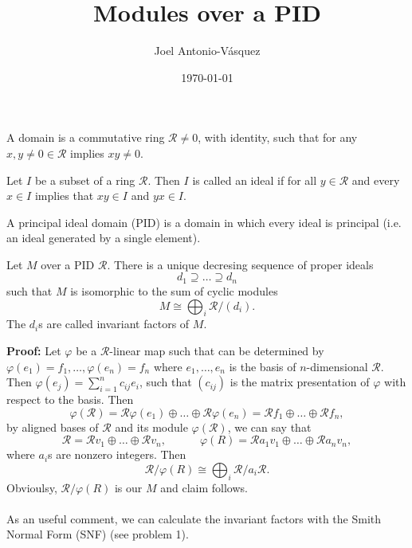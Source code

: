 \documentclass[11pt]{scrartcl}
\newcommand{\CR}{\mathcal R}
\begin{document}
\title{Modules over a PID}
\author{Joel Antonio-V\'asquez}
\date{\today}
\maketitle

\begin{definition*}
  A domain is a commutative ring $\CR \neq 0$, with identity, such that for any $x, y \neq 0 \in \CR$ implies $xy \neq 0$.
\end{definition*}

\begin{definition*}
  Let $I$ be a subset of a ring $\CR$. Then $I$ is called an ideal if for all $y \in \CR$ and every $x \in I$ implies that $xy \in I$ and $yx \in I$.
\end{definition*}

\begin{definition*}
  A principal ideal domain (PID) is a domain in which every ideal is principal (i.e. an ideal generated by a single element).
\end{definition*}

\begin{theorem}
  \label{theo:1}
  Let $M$ over a PID $\CR$. There is a unique decresing sequence of proper ideals
  $$
  d_{1} \supseteq \dots \supseteq d_{n}
  $$
  such that $M$ is isomorphic to the sum of cyclic modules
  $$
  M \cong \bigoplus_{i} \CR/(d_{i}).
  $$
  The $d_{i}$s are called invariant factors of $M$.
\end{theorem}
\textbf{Proof: }Let $\varphi$ be a $\CR$-linear map such that can be determined by $\varphi(e_{1}) = f_{1}, \dots, \varphi(e_{n}) = f_{n}$
where $e_{1}, \dots, e_{n}$ is the basis of $n$-dimensional $\CR$. Then $\varphi(e_{j}) = \sum_{i=1}^{n} c_{ij}e_{i}$, such that $(c_{ij})$ is the
matrix presentation of $\varphi$ with respect to the basis. Then
$$
\varphi(\CR) = \CR\varphi(e_{1}) \oplus \dots \oplus \CR\varphi(e_{n}) = \CR f_{1} \oplus \dots \oplus \CR f_{n},
$$
by aligned bases of $\CR$ and its module $\varphi(\CR)$, we can say that
$$
\CR = \CR v_{1} \oplus \dots \oplus \CR v_{n}, \hspace{3em} \varphi(R) = \CR a_{1}v_{1} \oplus \dots \oplus \CR a_{n}v_{n},
$$
where $a_{i}$s are nonzero integers. Then
$$
\CR/\varphi(R) \cong \bigoplus_{i} \CR/a_{i}\CR.
$$
Obvioulsy, $\CR/\varphi(R)$ is our $M$ and claim follows. \qedsymbol \\ \\
As an useful comment, we can calculate the invariant factors with the Smith
Normal Form (SNF) (see problem 1).
\end{document}
